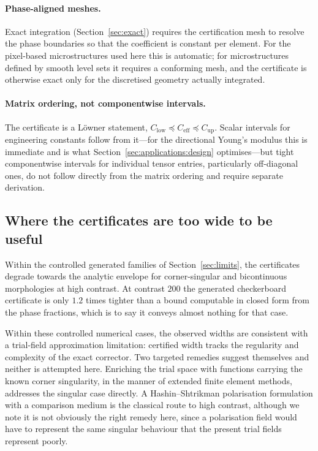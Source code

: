 \paragraph{Phase-aligned meshes.} Exact integration
(Section~\ref{sec:exact}) requires the certification mesh to resolve the
phase boundaries so that the coefficient is constant per element. For the
pixel-based microstructures used here this is automatic; for microstructures
defined by smooth level sets it requires a conforming mesh, and the
certificate is otherwise exact only for the discretised geometry actually
integrated.

\paragraph{Matrix ordering, not componentwise intervals.} The certificate
is a L\"owner statement,
$C_{\mathrm{low}} \preceq C_{\mathrm{eff}} \preceq C_{\mathrm{up}}$. Scalar
intervals for engineering constants follow from it---for the directional
Young's modulus this is immediate and is what
Section~\ref{sec:applications:design} optimises---but tight componentwise
intervals for individual tensor entries, particularly off-diagonal ones, do
not follow directly from the matrix ordering and require separate
derivation.

\subsection{Where the certificates are too wide to be useful}

Within the controlled generated families of Section~\ref{sec:limits}, the
certificates degrade towards the analytic envelope for corner-singular and
bicontinuous morphologies at high contrast. At contrast $200$ the generated
checkerboard certificate is only $1.2$ times tighter than a bound computable
in closed form from the phase fractions, which is to say it conveys almost
nothing for that case.

Within these controlled numerical cases, the observed widths are consistent
with a trial-field approximation limitation: certified width tracks the
regularity and complexity of the exact corrector. Two targeted remedies
suggest themselves and neither is attempted here. Enriching the trial space with functions carrying the
known corner singularity, in the manner of extended finite element methods,
addresses the singular case directly. A Hashin--Shtrikman polarisation
formulation with a comparison medium is the classical route to high
contrast, although we note it is not obviously the right remedy here, since
a polarisation field would have to represent the same singular behaviour
that the present trial fields represent poorly.

